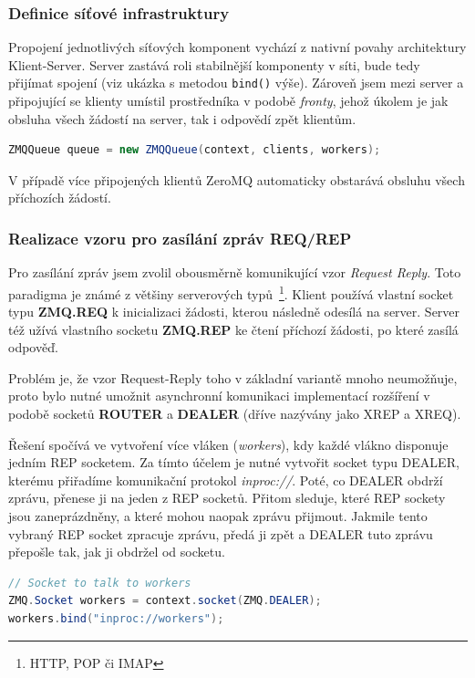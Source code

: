\documentclass[thesis=M,czech]{FITthesis}[2014/05/07]
\begin{document}
\subsubsection{Definice síťové infrastruktury}
\label{subsub:queue}
Propojení jednotlivých síťových komponent vychází z nativní povahy architektury Klient-Server. Server zastává roli stabilnější komponenty v síti, bude tedy přijímat spojení (viz ukázka s metodou \texttt{bind()} výše). Zároveň jsem mezi server a připojující se klienty umístil prostředníka v podobě \emph{fronty}, jehož úkolem je jak obsluha všech žádostí na server, tak i odpovědí zpět klientům.

\begin{lstlisting}[language=java]
ZMQQueue queue = new ZMQQueue(context, clients, workers);
\end{lstlisting}

V případě více připojených klientů ZeroMQ automaticky obstarává obsluhu všech příchozích žádostí. 

\subsubsection{Realizace vzoru pro zasílání zpráv REQ/REP}
Pro zasílání zpráv jsem zvolil obousměrně komunikující vzor \emph{Request Reply}. Toto paradigma je známé z většiny serverových typů~\footnote{HTTP, POP či IMAP}. Klient používá vlastní socket typu \textbf{ZMQ.REQ} k inicializaci žádosti, kterou následně odesílá na server. Server též užívá vlastního socketu \textbf{ZMQ.REP} ke čtení příchozí žádosti, po které zasílá odpověď. 

Problém je, že vzor Request-Reply toho v základní variantě mnoho neumožňuje, proto bylo nutné umožnit asynchronní komunikaci implementací rozšíření v podobě socketů \textbf{ROUTER} a \textbf{DEALER} (dříve nazývány jako XREP a XREQ). 

Řešení spočívá ve vytvoření více vláken (\emph{workers}), kdy každé vlákno disponuje jedním REP socketem. Za tímto účelem je nutné vytvořit socket typu DEALER, kterému přiřadíme komunikační protokol \emph{inproc://}. Poté, co DEALER obdrží zprávu, přenese ji na jeden z REP socketů. Přitom sleduje, které REP sockety jsou zaneprázdněny, a které mohou naopak zprávu přijmout. Jakmile tento vybraný REP socket zpracuje zprávu, předá ji zpět a DEALER tuto zprávu přepošle tak, jak ji obdržel od socketu.

\begin{lstlisting}[language=java]
// Socket to talk to workers
ZMQ.Socket workers = context.socket(ZMQ.DEALER);
workers.bind("inproc://workers");
\end{lstlisting}
\end{document}
